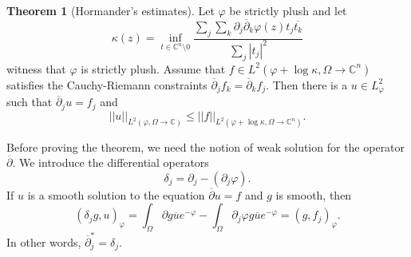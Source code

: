 \documentclass[12pt]{report}
\newcommand{\CC}{\mathbb{C}}
\newcommand{\dbar}{\overline \partial}
\theoremstyle{definition}
\newtheorem{theorem}{Theorem}[chapter]
\begin{document}
\begin{theorem}[Hormander's estimates]
    Let $\varphi$ be strictly plush and let
    $$\kappa(z) = \inf_{t \in \CC^n \setminus 0} \frac{\sum_j\sum_k \partial_j \dbar_k \varphi(z) t_j \overline{t_k}}{\sum_j |t_j|^2}$$
    witness that $\varphi$ is strictly plush. Assume that $f \in L^2(\varphi + \log \kappa, \Omega \to \CC^n)$ satisfies the Cauchy-Riemann constraints $\dbar_j f_k = \dbar_k f_j$. Then there is a $u \in L^2_\varphi$ such that $\dbar_j u = f_j$ and
    $$||u||_{L^2(\varphi, \Omega \to \CC)} \leq ||f||_{L^2(\varphi + \log \kappa, \Omega \to \CC^n)}.$$
\end{theorem}
Before proving the theorem, we need the notion of weak solution for the operator $\dbar$. We introduce the differential operators
$$\delta_j = \partial_j - (\partial_j \varphi).$$
If $u$ is a smooth solution to the equation $\dbar u = f$ and $g$ is smooth, then
$$(\delta_j g, u)_\varphi
    = \int_\Omega \partial g \overline u e^{-\varphi} - \int_\Omega \partial_j \varphi g \overline u e^{-\varphi}
    = (g, f_j)_\varphi.$$
In other words, $\dbar_j^* = \delta_j$. 
\end{document}
